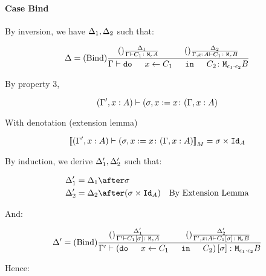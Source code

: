{    \paragraph{Case Bind}

    By inversion, we have $\Delta_1, \Delta_2$ such that:
    
    \begin{equation}
        \D = \treerule{Bind}{
            \treerule{}{\D_1}{\typerelation{\G}{C_1}{\mea}}
            \s\s
            \treerule{}{\D_2}{\typerelation{\G, x:A }{C_1}{\meb}}
        }{
            \typerelation{\G}{\doin{x}{C_1}{C_2}}{\M{\e_1\dot\e_2}{B}}
        }
    \end{equation}

    By property 3,

    \begin{equation}
        (\Gamma', x:A) \vdash (\sigma, x:= x \colon (\Gamma, x: A)
    \end{equation}

    With denotation (extension lemma)

    \begin{equation}
        {\bf [\![}(\Gamma', x:A) \vdash (\sigma, x:= x \colon (\Gamma, x: A){\bf ]\!]}_M = \sigma\times\texttt{Id}_{A}
    \end{equation}

    By induction, we derive $\Delta_1', \Delta_2'$ such that:

    \begin{align}
        \D_1' & = \D_1\after \si\\
        \D_2' & = \D_2\after (\si\times\Id{A})\qt{By Extension Lemma}
    \end{align}

    And:

    \begin{equation}
        \D' = \treerule{Bind}{
            \treerule{}{\D_1'}{\typerelation{\G'}{C_1\ssi}{\mea}}
            \s\s
            \treerule{}{\D_2'}{\typerelation{\G', x:A }{C_1\ssi}{\meb}}
        }{
            \typerelation{\G'}{(\doin{x}{C_1}{C_2})\ssi}{\M{\e_1\dot\e_2}{B}}
        }
    \end{equation}

    Hence:

}
